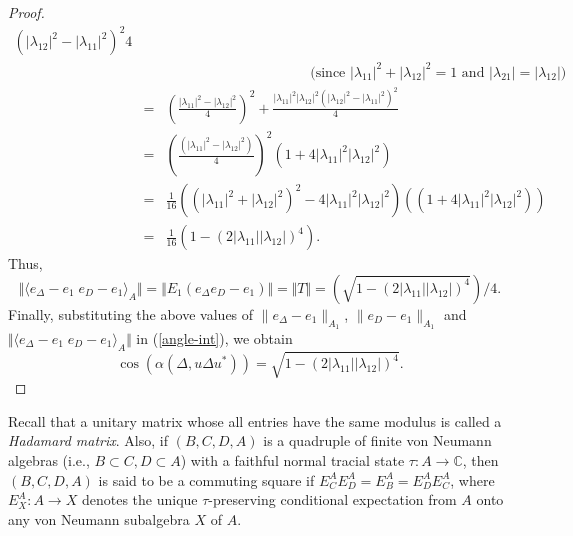 \documentclass[a4]{amsart}
\numberwithin{equation}{section}
\newcommand{\C}{\mathbb{C}}
\begin{document}
\begin{proof}
\begin{eqnarray*}
{                  (|\lambda_{12}|^2 - |\lambda_{11}|^2)^2}{4} \\
                  & & \qquad \qquad
                \qquad \qquad \qquad \text{ (since
                  $|\lambda_{11}|^2+|\lambda_{12}|^2 = 1$ and
                  $|\lambda_{21}| = |\lambda_{12}|$)}\\
                   & = &
                \left(\frac{|\lambda_{11}|^2 -
                  |\lambda_{12}|^2}{4}\right)^2 +
                \frac{|\lambda_{11}|^2 |\lambda_{12}|^2
                  (|\lambda_{12}|^2 - |\lambda_{11}|^2)^2}{4}\\
 & = &                \left(\frac{(|\lambda_{11}|^2 -
                  |\lambda_{12}|^2)}{4}\right)^2 \left(1+ 4
                |\lambda_{11}|^2 |\lambda_{12}|^2\right)\\ & = &
                \frac{1}{16}\left( (|\lambda_{11}|^2 +
                |\lambda_{12}|^2)^2 - 4|\lambda_{11}|^2
                |\lambda_{12}|^2\right) \left( (1+4|\lambda_{11}|^2
                |\lambda_{12}|^2)\right)\\
                & = & \frac{1}{16} \left(1-(2 |\lambda_{11}||\lambda_{12}|)^4\right).
\end{eqnarray*}
        Thus,
        \[
         \Vert \langle e_\Delta - e_1 \; e_D - e_1 \rangle_{A}\Vert = \Vert E_1(e_\Delta e_D - e_1)\Vert 
   =  \Vert T \Vert
  =  \left(\sqrt{1- (2|\lambda_{11}| |\lambda_{12}|)^4}\right)/4.
        \]
Finally, substituting the above values of $\|e_\Delta -e_1 \|_{A_1}$,
$\|e_{D} -e_1 \|_{A_1}$ and $ \Vert \langle e_\Delta - e_1 \; e_D - e_1
\rangle_{A}\Vert $ in  (\ref{angle-int}), we obtain
\[
\cos(\alpha(\Delta, u\Delta u^*)) = \sqrt{1-(2 |\lambda_{11}| |\lambda_{12}|)^4}.
\]
  \end{proof}



Recall that a unitary matrix whose all entries have the same modulus is
called a {\em Hadamard matrix}. Also, if $(B,C,D,A)$ is a quadruple of
finite von Neumann algebras (i.e., $B \subset C, D \subset A$) with a
faithful normal tracial state $\tau:A \to \C$, then $(B,C,D,A)$ is
said to be a commuting square if $E^A_C E^A_D = E^A_B = E^A_D E^A_C$,
where $E^A_X: A \to X$ denotes the unique $\tau$-preserving conditional
expectation from $A$ onto any von Neumann subalgebra $X$ of $A$.
\end{document}
